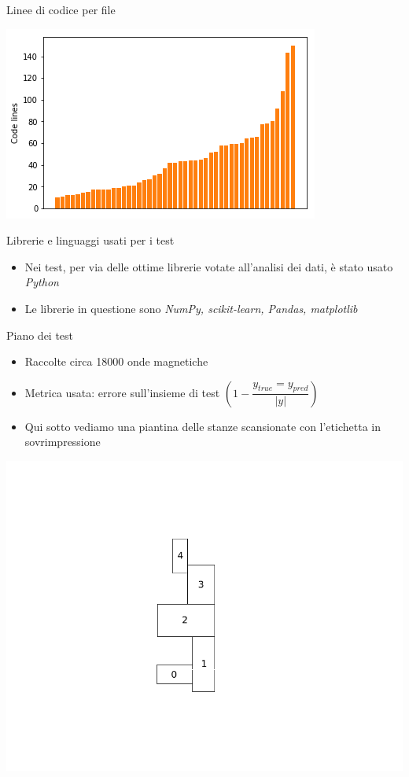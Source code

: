 \documentclass[11pt]{beamer}
\begin{document}
	\begin{frame}{Linee di codice per file}
		\begin{center}
			\includegraphics[width=1\linewidth]{img/codelines}
		\end{center}
	\end{frame}
	\begin{frame}{Librerie e linguaggi usati per i test}
		\begin{itemize}
			\item Nei test, per via delle ottime librerie votate all'analisi dei dati, \`e stato usato \textit{Python}
			\item Le librerie in questione sono \textit{NumPy, scikit-learn, Pandas, matplotlib}
		\end{itemize}
	\end{frame}
	\begin{frame}{Piano dei test}
		\begin{itemize}
			\item Raccolte circa 18000 onde magnetiche
			\item Metrica usata: errore sull'insieme di test $\left(1 - \dfrac{y_{true} = y_{pred}}{\lvert y\lvert } \right)$
			\item Qui sotto vediamo una piantina delle stanze scansionate con l'etichetta in sovrimpressione
		\end{itemize}
		\includegraphics[width=0.7\linewidth]{img/test_pianta_casa}
	\end{frame}
\end{document}
